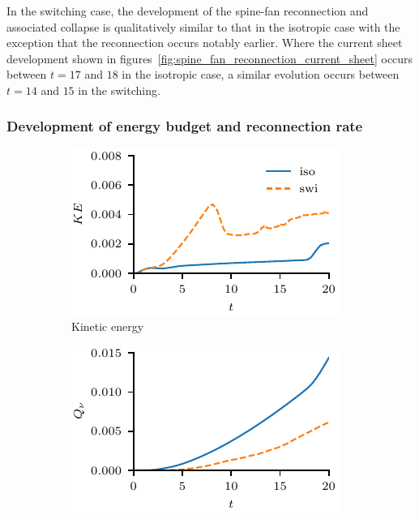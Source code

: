 In the switching case, the development of the spine-fan reconnection and associated collapse is qualitatively similar to that in the isotropic case with the exception that the reconnection occurs notably earlier. Where the current sheet development shown in figures~\ref{fig:spine_fan_reconnection_current_sheet} occurs between $t=17$ and $18$ in the isotropic case, a similar evolution occurs between $t=14$ and $15$ in the switching.

\subsubsection{Development of energy budget and reconnection rate}

\begin{figure}[t]
  \centering
  \begin{subfigure}{0.32\textwidth}
    \includegraphics[width=\linewidth]{v-4r-4_kinetic_energy}
    \caption{Kinetic energy}
    \label{fig:v-4r-4_kinetic_energy}
  \end{subfigure}
  \hfill
  \begin{subfigure}{0.32\textwidth}
    \includegraphics[width=\linewidth]{v-4r-4_viscous_heating}

\end{subfigure}
\end{figure}
